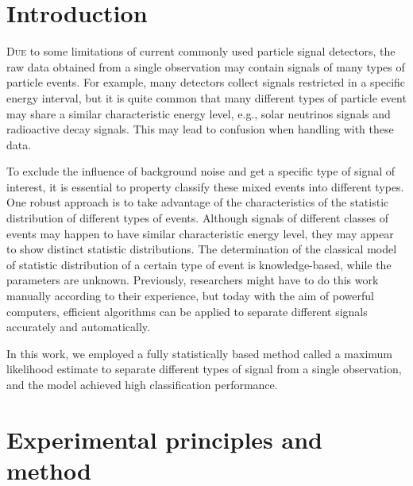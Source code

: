 \documentclass[10pt,a4paper,twocolumn,twoside,UTF8]{article}
\begin{document}
\renewcommand{\thefootnote}{\fnsymbol{footnote}}

\thispagestyle{firstpage} 
\pagestyle{maincontent}

\section{Introduction}

\lettrine[lines=2]{D}{ue} to some limitations of current commonly used particle signal detectors, the raw data obtained from a single observation may contain signals of many types of particle events.
For example, many detectors collect signals restricted in a specific energy interval, but it is quite common that many different types of particle event may share a similar characteristic energy level, e.g., solar neutrinos signals and radioactive decay signals.
This may lead to confusion when handling with these data.

To exclude the influence of background noise and get a specific type of signal of interest, it is essential to property classify these mixed events into different types. 
One robust approach is to take advantage of the characteristics of the statistic distribution of different types of events. 
Although signals of different classes of events may happen to have similar characteristic energy level, they may appear to show distinct statistic distributions. 
The determination of the classical model of statistic distribution of a certain type of event is knowledge-based, while the parameters are unknown. 
Previously, researchers might have to do this work manually according to their experience, but today with the aim of powerful computers, efficient algorithms can be applied to separate different signals accurately and automatically. 

In this work, we employed a fully statistically based method called a maximum likelihood estimate to separate different types of signal from a single observation, and the model achieved high classification performance.


\section{Experimental principles and method}
\end{document}
